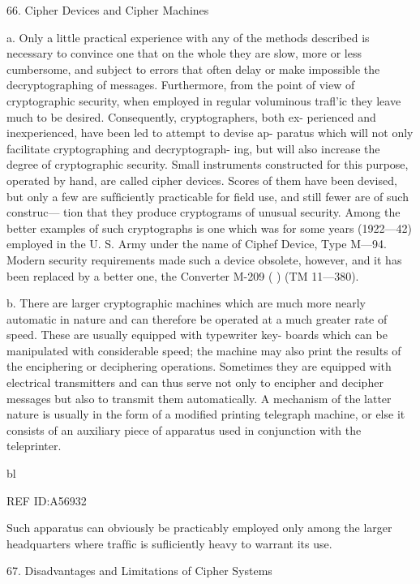 {66. Cipher Devices and Cipher Machines

a. Only a little practical experience with any of the methods described
is necessary to convince one that on the whole they are slow, more or less
cumbersome, and subject to errors that often delay or make impossible
the decryptographing of messages. Furthermore, from the point of view
of cryptographic security, when employed in regular voluminous traﬂ'ic
they leave much to be desired. Consequently, cryptographers, both ex-
perienced and inexperienced, have been led to attempt to devise ap-
paratus which will not only facilitate cryptographing and decryptograph-
ing, but will also increase the degree of cryptographic security. Small
instruments constructed for this purpose, operated by hand, are called
cipher devices. Scores of them have been devised, but only a few are
sufﬁciently practicable for ﬁeld use, and still fewer are of such construc—
tion that they produce cryptograms of unusual security. Among the
better examples of such cryptographs is one which was for some years
(1922—42) employed in the U. S. Army under the name of Ciphef
Device, Type M—94. Modern security requirements made such a device
obsolete, however, and it has been replaced by a better one, the Converter
M-209 ( ) (TM 11—380).

b. There are larger cryptographic machines which are much more
nearly automatic in nature and can therefore be operated at a much
greater rate of speed. These are usually equipped with typewriter key-
boards which can be manipulated with considerable speed; the machine
may also print the results of the enciphering or deciphering operations.
Sometimes they are equipped with electrical transmitters and can thus
serve not only to encipher and decipher messages but also to transmit
them automatically. A mechanism of the latter nature is usually in the
form of a modiﬁed printing telegraph machine, or else it consists of an
auxiliary piece of apparatus used in conjunction with the teleprinter.

bl

 

 

 

 

REF ID:A56932

Such apparatus can obviously be practicably employed only among the
larger headquarters where trafﬁc is suﬂiciently heavy to warrant its use.

67. Disadvantages and Limitations of Cipher Systems

}
